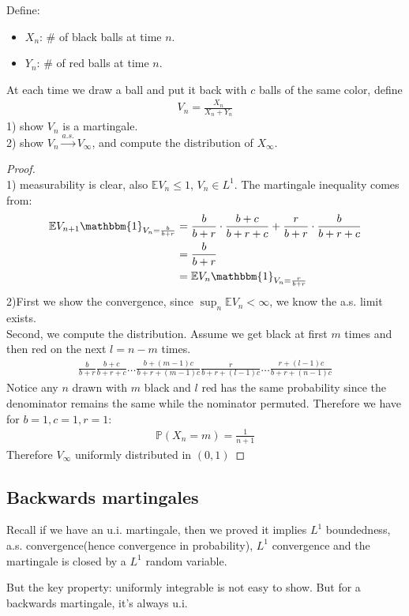 \begin{example}
Define:
\begin{itemize}
	\item $X_n$: \# of black balls at time $n$.
	\item $Y_n$: \# of red balls at time $n$.
\end{itemize}
At each time we draw a ball and put it back with $c$ balls of the same color, define
\begin{align*}
	V_n = \frac{X_n}{X_n + Y_n}
\end{align*}
1) show $V_n$ is a martingale.\\
2) show $V_n \overset{a.s.}{\rightarrow} V_\infty$, and compute the distribution of $X_\infty$.
\begin{proof}
	\quad\\
	1) measurability is clear, also $\mathbb{E}V_n \le 1$, $V_n \in L^1$. The martingale inequality comes from:
	\begin{align*}
		\mathbb{E} V_{n+1} \mathbbm{1}_{V_n = \frac{b}{b+r}} &= \frac{b}{b+r}  \cdot \frac{b+c}{b+r+c} + \frac{r}{b + r} \cdot \frac{b}{b + r + c}\\
		&= \frac{b}{b+r}\\
		&= \mathbb{E} V_n \mathbbm{1}_{V_n = \frac{r}{b+r}}
	\end{align*}
	2)First we show the convergence, since $\sup_n \mathbb{E} V_n < \infty$, we know the a.s. limit exists. \\
	Second, we compute the distribution. Assume we get black at first $m$ times and then red on the next $l = n-m$ times.
	\begin{align*}
		 \frac{b}{b+r} \frac{b+c}{b+r+c} \dots \frac{b+(m-1)c}{b+r + (m-1)c} \frac{r}{b+r +(l-1)c} \dots \frac{r + (l-1)c}{b+r+(n-1)c}
	\end{align*}
	Notice any $n$ drawn with $m$ black and $l$ red has the same probability since the denominator remains the same while the nominator permuted. Therefore we have for $b = 1, c= 1, r = 1$:
	\begin{align*}
		\mathbb{P}(X_n = m) = \frac{1}{n+1}
	\end{align*}
	Therefore $V_\infty$ uniformly distributed in $(0, 1)$
\end{proof} 	
\end{example}





\subsection{Backwards martingales}
Recall if we have an u.i. martingale, then we proved it implies $L^1$ boundedness, a.s. convergence(hence convergence in probability), $L^1$ convergence and the martingale is closed by a $L^1$ random variable.\par
But the key property: uniformly integrable is not easy to show. But for a backwards martingale, it's always u.i.

